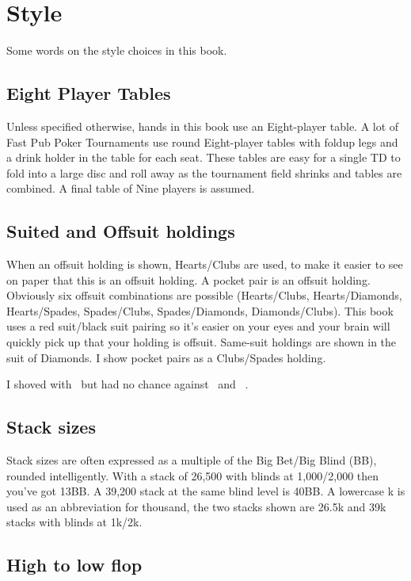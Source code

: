 \chapter{Style}


Some words on the style choices in this book.

\section*{Eight Player Tables}

Unless specified otherwise, hands in this book use an
Eight-player table. A lot of Fast Pub Poker Tournaments use
round Eight-player tables with foldup legs and a drink holder
in the table for each seat. These tables are easy for a single TD
to fold into a large disc and roll away as the tournament
field shrinks and tables are combined. A final table of Nine players
is assumed.

\section*{Suited and Offsuit holdings}

When an offsuit holding is shown, Hearts/Clubs are used, to make
it easier to see on paper that this is an offsuit holding. A pocket
pair is an offsuit holding. Obviously six offsuit combinations are
possible (Hearts/Clubs, Hearts/Diamonds, Hearts/Spades, Spades/Clubs,
Spades/Diamonds, Diamonds/Clubs). This book uses a red suit/black suit
pairing so it's easier on your eyes and your brain will quickly pick
up that your holding is offsuit. Same-suit holdings are shown in the
suit of Diamonds. I show pocket pairs as a Clubs/Spades holding.

I shoved with \Ah\tenc\ but had no chance against \Ad\Kd\ and \Jc\Js\ .

\section*{Stack sizes}

Stack sizes are often expressed as a multiple of the Big Bet/Big Blind
(BB), rounded intelligently. With a stack of 26,500 with blinds at
1,000/2,000 then you've got 13BB. A 39,200 stack at the same blind
level is 40BB. A lowercase k is used as an abbreviation for thousand,
the two stacks shown are 26.5k and 39k stacks with blinds at 1k/2k.

\section*{High to low flop}

